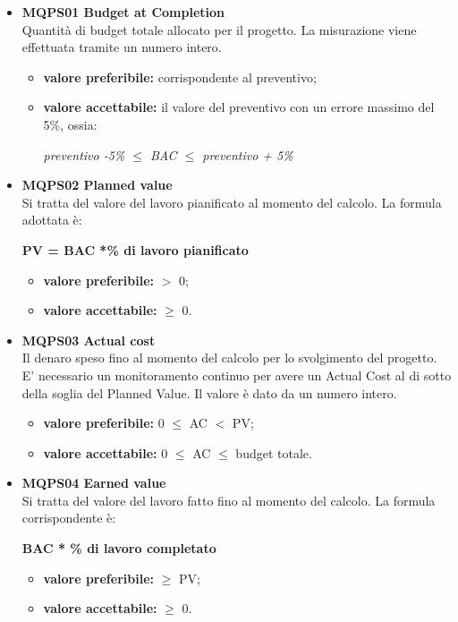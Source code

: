 \begin{itemize}
	\item[] \textbf{MQPS01 Budget at Completion} \\
	Quantità di budget totale allocato per il progetto.
	La misurazione viene effettuata tramite un numero intero.
	\begin{itemize}
		\item \textbf{valore preferibile:} corrispondente al preventivo;
		\item \textbf{valore accettabile:} il valore del preventivo con un errore massimo del 5\%, ossia:
		\begin{center}
			\textit{preventivo -5\% $\leq$ BAC $\leq$ preventivo + 5\%}
		\end{center}
	\end{itemize}

	\item[] \textbf{MQPS02 Planned value} \\
	Si tratta del valore del lavoro pianificato al momento del calcolo.
	La formula adottata è:
	\begin{center}
		\textbf{PV = BAC *\% di lavoro pianificato}
	\end{center}
	\begin{itemize}
		\item \textbf{valore preferibile:} $>$ 0;
		\item \textbf{valore accettabile:} $\geq$ 0.
	\end{itemize}

	\item[] \textbf{MQPS03 Actual cost} \\
	Il denaro speso fino al momento del calcolo per lo svolgimento del progetto.
	E’ necessario un monitoramento continuo per avere un Actual Cost al di sotto della soglia del Planned Value.
	Il valore è dato da un numero intero.
	\begin{itemize}
		\item \textbf{valore preferibile:} 0 $\leq$ AC $<$ PV;
		\item \textbf{valore accettabile:}  0 $\leq$ AC $\leq$  budget totale.
	\end{itemize}

	\item[] \textbf{MQPS04 Earned value} \\
	Si tratta del valore del lavoro fatto fino al momento del calcolo.
	La formula corrispondente è:
	\begin{center}
		\textbf{BAC * \% di lavoro completato}
	\end{center}
	\begin{itemize}
		\item \textbf{valore preferibile:} $\geq$ PV;
		\item \textbf{valore accettabile:} $\geq$ 0.
	\end{itemize}


\end{itemize}
